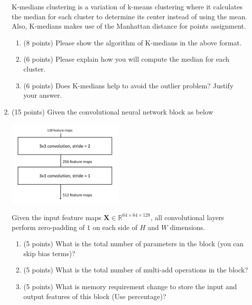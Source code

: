 \documentclass[11pt]{article}
\begin{document}
\begin{enumerate}
        K-medians clustering is a variation of k-means clustering
        where it calculates the median for each cluster to determine
        its center instead of using the mean. Also, K-medians makes
        use of the Manhattan distance for points assignment.
        
        \begin{enumerate}
            \item (8 points) Please show the algorithm of K-medians
            in the above format.


            \item (6 points) Please explain how you will compute the median
            for each cluster.


            \item (6 points) Does K-medians help to avoid the outlier
            problem? Justify your answer.

        \end{enumerate}
    
    \item (15 points) Given the convolutional neural network block as below
    \begin{center}
        \vspace{-10pt}
        \includegraphics[width=0.45\textwidth]{FIG/cnnblock.pdf}
    \end{center}
    Given the input feature maps $\boldsymbol X \in
    \mathbb{R}^{64\times 64 \times 128}$, all convolutional
    layers perform zero-padding of $1$ on each side of $H$ and
    $W$ dimensions.
    \begin{enumerate}
    \item (5 points) What is the total number of parameters in
    the block (you can skip bias terms)?


    \item (5 points) What is the total number of multi-add
    operations in the block?


    \item (5 points) What is memory requirement change to store
    the input and output features of this block (Use percentage)?
    \end{enumerate}


\end{enumerate}
\end{document}
